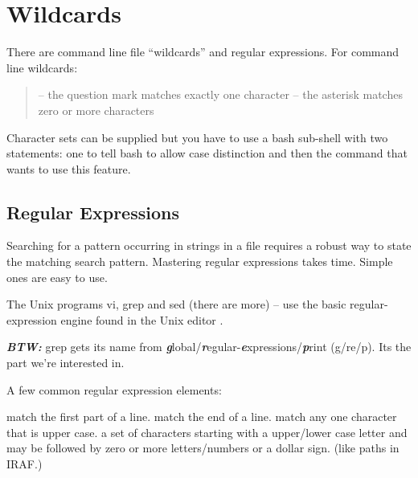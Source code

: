

\section{Wildcards}

There are command line file ``wildcards'' and regular expressions. For
command line wildcards:

\begin{quote}
{\color{verbcolor}{\verb#?#}}  -- the question mark matches exactly one character
{\color{verbcolor}{\verb#*#}}  -- the asterisk matches zero or more characters
\end{quote}

Character sets can be supplied but you have to use a bash sub-shell
with two statements: one to tell bash to allow case distinction
{\color{verbcolor}{\verb#LC_ALL=C#}} and then the command that wants
to use this feature.

\begin{quote}
{\color{verbcolor}{\verb#! (export LC_ALL=C; rm [a-z]_*fits 2> /dev/null;)#}}
\end{quote}

\subsection{Regular Expressions}

Searching for a pattern occurring in strings in a file requires a robust
way to state the matching search pattern. Mastering regular expressions
takes time. Simple ones are easy to use.

The Unix programs vi, grep and sed (there are more) -- use the basic
regular-expression engine found in the Unix editor
{\color{verbcolor}{\verb#ed#}}.

\textbf{\emph{BTW:}} grep gets its name from \textbf{\emph{g}}lobal/\textbf{\emph{r}}egular-\textbf{\emph{e}}xpressions/\textbf{\emph{p}}rint (g/re/p). Its the {\color{verbcolor}{\verb#re#}} part
we're interested in.


A few common regular expression
elements:

{\color{verbcolor}{\verb#^#}} match the first part of a line.
{\color{verbcolor}{\verb#$#}} match the end of a line.
{\color{verbcolor}{\verb#[A-Z]#}} match any one character that is upper case.
{\color{verbcolor}{\verb#[A-Za-z][A-Za-z0-9$]*#}} a set of characters starting with a upper/lower
case letter and may be followed by zero or more letters/numbers or a dollar
sign. (like paths in IRAF.)

